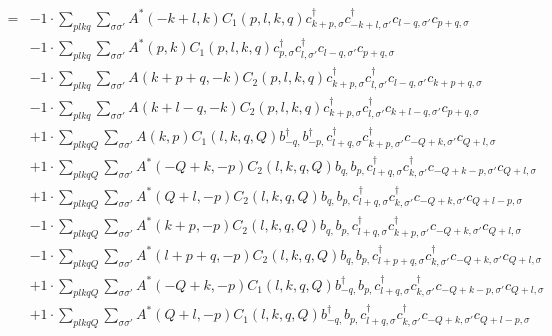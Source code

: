 \begin{align*}
	[\eta, H'] = 	&-1 \cdot \sum_{ p l k q } \sum_{ \sigma \sigma' } A^*( -k+l, k )  C_1( p, l, k, q )   c_{ k+p, \sigma }^\dagger  c_{ -k+l, \sigma' }^\dagger  c_{ l-q, \sigma' } c_{ p+q, \sigma }  \\
	&-1 \cdot \sum_{ p l k q } \sum_{ \sigma \sigma' } A^*( p, k )  C_1( p, l, k, q )   c_{ p, \sigma }^\dagger  c_{ l, \sigma' }^\dagger  c_{ l-q, \sigma' } c_{ p+q, \sigma }  \\
	&-1 \cdot \sum_{ p l k q } \sum_{ \sigma \sigma' } A( k+p+q, -k )  C_2( p, l, k, q )   c_{ k+p, \sigma }^\dagger  c_{ l, \sigma' }^\dagger  c_{ l-q, \sigma' } c_{ k+p+q, \sigma }  \\
	&-1 \cdot \sum_{ p l k q } \sum_{ \sigma \sigma' } A( k+l-q, -k )  C_2( p, l, k, q )   c_{ k+p, \sigma }^\dagger  c_{ l, \sigma' }^\dagger  c_{ k+l-q, \sigma' } c_{ p+q, \sigma }  \\
	&+1 \cdot \sum_{ p l k q Q } \sum_{ \sigma \sigma' } A( k, p )  C_1( l, k, q, Q )   b_{ -q, }^\dagger  b_{ -p, }^\dagger  c_{ l+q, \sigma }^\dagger  c_{ k+p, \sigma' }^\dagger  c_{ -Q+k, \sigma' } c_{ Q+l, \sigma }  \\
	&+1 \cdot \sum_{ p l k q Q } \sum_{ \sigma \sigma' } A^*( -Q+k, -p )  C_2( l, k, q, Q )   b_{ q, } b_{ p, } c_{ l+q, \sigma }^\dagger  c_{ k, \sigma' }^\dagger  c_{ -Q+k-p, \sigma' } c_{ Q+l, \sigma }  \\
	&+1 \cdot \sum_{ p l k q Q } \sum_{ \sigma \sigma' } A^*( Q+l, -p )  C_2( l, k, q, Q )   b_{ q, } b_{ p, } c_{ l+q, \sigma }^\dagger  c_{ k, \sigma' }^\dagger  c_{ -Q+k, \sigma' } c_{ Q+l-p, \sigma }  \\
	&-1 \cdot \sum_{ p l k q Q } \sum_{ \sigma \sigma' } A^*( k+p, -p )  C_2( l, k, q, Q )   b_{ q, } b_{ p, } c_{ l+q, \sigma }^\dagger  c_{ k+p, \sigma' }^\dagger  c_{ -Q+k, \sigma' } c_{ Q+l, \sigma }  \\
	&-1 \cdot \sum_{ p l k q Q } \sum_{ \sigma \sigma' } A^*( l+p+q, -p )  C_2( l, k, q, Q )   b_{ q, } b_{ p, } c_{ l+p+q, \sigma }^\dagger  c_{ k, \sigma' }^\dagger  c_{ -Q+k, \sigma' } c_{ Q+l, \sigma }  \\
	&+1 \cdot \sum_{ p l k q Q } \sum_{ \sigma \sigma' } A^*( -Q+k, -p )  C_1( l, k, q, Q )   b_{ -q, }^\dagger  b_{ p, } c_{ l+q, \sigma }^\dagger  c_{ k, \sigma' }^\dagger  c_{ -Q+k-p, \sigma' } c_{ Q+l, \sigma }  \\
	&+1 \cdot \sum_{ p l k q Q } \sum_{ \sigma \sigma' } A^*( Q+l, -p )  C_1( l, k, q, Q )   b_{ -q, }^\dagger  b_{ p, } c_{ l+q, \sigma }^\dagger  c_{ k, \sigma' }^\dagger  c_{ -Q+k, \sigma' } c_{ Q+l-p, \sigma }  \\

\end{align*}
